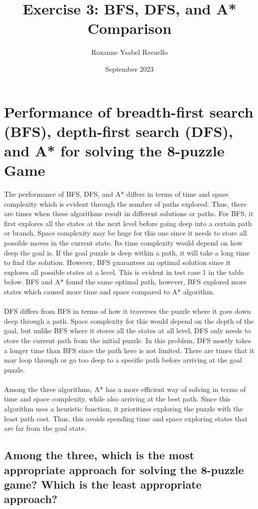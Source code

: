 \documentclass{article}
\title{\Large{\textbf{Exercise 3: BFS, DFS, and A* Comparison}}}
\author{Roxanne Ysabel Resuello}
\date{September 2023}
\begin{document}
\maketitle

\section{Performance of breadth-first search (BFS), depth-first search (DFS), and A* for solving the 8-puzzle Game}

The performance of BFS, DFS, and A* differs in terms of time and space complexity which is evident through the number of paths explored. Thus, there are times when these algorithms result in different solutions or paths. For BFS, it first explores all the states at the next level before going deep into a certain path or branch. Space complexity may be huge for this one since it needs to store all possible moves in the current state. Its time complexity would depend on how deep the goal is. If the goal puzzle is deep within a path, it will take a long time to find the solution. However, BFS guarantees an optimal solution since it explores all possible states at a level. This is evident in test case 1 in the table below. BFS and A* found the same optimal path, however, BFS explored more states which caused more time and space compared to A* algorithm.\\\\
DFS differs from BFS in terms of how it traverses the puzzle where it goes down deep through a path. Space complexity for this would depend on the depth of the goal, but unlike BFS where it stores all the states at all level, DFS only needs to store the current path from the initial puzzle. In this problem, DFS mostly takes a longer time than BFS since the path here is not limited. There are times that it may loop through or go too deep to a specific path before arriving at the goal puzzle.\\\\
Among the three algorithms, A* has a more efficient way of solving in terms of time and space complexity, while also arriving at the best path. Since this algorithm uses a heuristic function, it prioritizes exploring the puzzle with the least path cost. Thus, this avoids spending time and space exploring states that are far from the goal state.


\subsection{Among the three, which is the most appropriate approach for solving the 8-puzzle game? Which is the least appropriate approach?}
\end{document}
